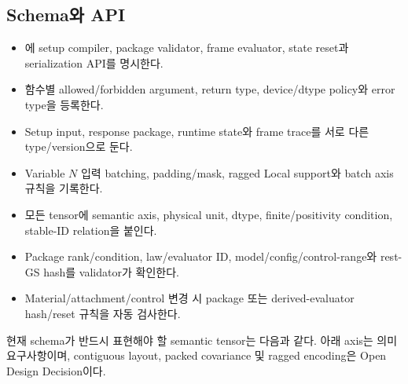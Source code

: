 \documentclass[10pt]{article}
\begin{document}
\subsection{Schema와 API}

\begin{itemize}
  \item[$\square$] 에 setup compiler, package validator, frame evaluator,
  state reset과 serialization API를 명시한다.
  \item[$\square$] 함수별 allowed/forbidden argument, return type, device/dtype policy와 error type을 등록한다.
  \item[$\square$] Setup input, response package, runtime state와 frame trace를 서로 다른 type/version으로 둔다.
  \item[$\square$] Variable \(N\) 입력 batching, padding/mask, ragged Local support와 batch axis 규칙을 기록한다.
  \item[$\square$] 모든 tensor에 semantic axis, physical unit, dtype, finite/positivity condition, stable-ID relation을 붙인다.
  \item[$\square$] Package rank/condition, law/evaluator ID, model/config/control-range와 rest-GS hash를 validator가 확인한다.
  \item[$\square$] Material/attachment/control 변경 시 package 또는 derived-evaluator hash/reset 규칙을 자동 검사한다.
\end{itemize}

현재 schema가 반드시 표현해야 할 semantic tensor는 다음과 같다. 아래 axis는 의미 요구사항이며,
contiguous layout, packed covariance 및 ragged encoding은 Open Design Decision이다.
\end{document}
